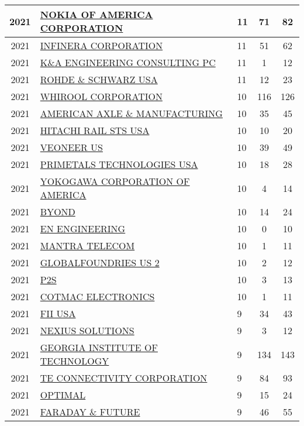 \documentclass{article}%
\begin{document}
\begin{longtable}{c|p{20em}|p{5em}|c|c}
\hline%
2021&\hyperref[subsec:NOKIAOFAMERICACORPORATION]{NOKIA OF AMERICA CORPORATION}&11&71&82\\%
\hline%
2021&\hyperref[subsec:INFINERACORPORATION]{INFINERA CORPORATION}&11&51&62\\%
\hline%
2021&\hyperref[subsec:KAENGINEERINGCONSULTINGPC]{K\&A ENGINEERING CONSULTING PC}&11&1&12\\%
\hline%
2021&\hyperref[subsec:ROHDESCHWARZUSA]{ROHDE \& SCHWARZ USA}&11&12&23\\%
\hline%
2021&\hyperref[subsec:WHIROOLCORPORATION]{WHIROOL CORPORATION}&10&116&126\\%
\hline%
2021&\hyperref[subsec:AMERICANAXLEMANUFACTURING]{AMERICAN AXLE \& MANUFACTURING}&10&35&45\\%
\hline%
2021&\hyperref[subsec:HITACHIRAILSTSUSA]{HITACHI RAIL STS USA}&10&10&20\\%
\hline%
2021&\hyperref[subsec:VEONEERUS]{VEONEER US}&10&39&49\\%
\hline%
2021&\hyperref[subsec:PRIMETALSTECHNOLOGIESUSA]{PRIMETALS TECHNOLOGIES USA}&10&18&28\\%
\hline%
2021&\hyperref[subsec:YOKOGAWACORPORATIONOFAMERICA]{YOKOGAWA CORPORATION OF AMERICA}&10&4&14\\%
\hline%
2021&\hyperref[subsec:BYOND]{BYOND}&10&14&24\\%
\hline%
2021&\hyperref[subsec:ENENGINEERING]{EN ENGINEERING}&10&0&10\\%
\hline%
2021&\hyperref[subsec:MANTRATELECOM]{MANTRA TELECOM}&10&1&11\\%
\hline%
2021&\hyperref[subsec:GLOBALFOUNDRIESUS2]{GLOBALFOUNDRIES US 2}&10&2&12\\%
\hline%
2021&\hyperref[subsec:P2S]{P2S}&10&3&13\\%
\hline%
2021&\hyperref[subsec:COTMACELECTRONICS]{COTMAC ELECTRONICS}&10&1&11\\%
\hline%
2021&\hyperref[subsec:FIIUSA]{FII USA}&9&34&43\\%
\hline%
2021&\hyperref[subsec:NEXIUSSOLUTIONS]{NEXIUS SOLUTIONS}&9&3&12\\%
\hline%
2021&\hyperref[subsec:GEORGIAINSTITUTEOFTECHNOLOGY]{GEORGIA INSTITUTE OF TECHNOLOGY}&9&134&143\\%
\hline%
2021&\hyperref[subsec:TECONNECTIVITYCORPORATION]{TE CONNECTIVITY CORPORATION}&9&84&93\\%
\hline%
2021&\hyperref[subsec:OPTIMAL]{OPTIMAL}&9&15&24\\%
\hline%
2021&\hyperref[subsec:FARADAYFUTURE]{FARADAY \& FUTURE}&9&46&55\\%

\end{longtable}
\end{document}
